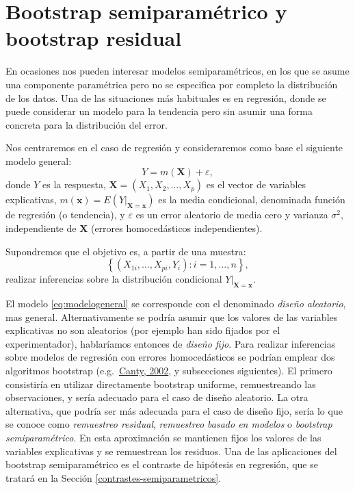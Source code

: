 \documentclass[
]{book}
\theoremstyle{break}
\theoremstyle{definition}
\theoremstyle{definition}
\theoremstyle{definition}
\theoremstyle{remark}
\begin{document}
\hypertarget{boot-reg}{%
\section{Bootstrap semiparamétrico y bootstrap residual}\label{boot-reg}}

En ocasiones nos pueden interesar modelos semiparamétricos, en los que se asume una componente paramétrica pero no se especifica por completo la distribución de los datos.
Una de las situaciones más habituales es en regresión, donde se puede considerar un modelo para la tendencia pero sin asumir una forma concreta para la distribución del error.

Nos centraremos en el caso de regresión y consideraremos como base el siguiente modelo general:
\begin{equation} 
  Y = m(\mathbf{X}) + \varepsilon,
  \label{eq:modelogeneral}
\end{equation}
donde \(Y\) es la respuesta, \(\mathbf{X}=(X_1, X_2, \ldots, X_p)\) es el vector de variables explicativas, \(m(\mathbf{x}) = E\left( \left. Y\right\vert_{\mathbf{X}=\mathbf{x}} \right)\) es la media condicional, denominada función de regresión (o tendencia), y \(\varepsilon\) es un error aleatorio de media cero y varianza \(\sigma^2\), independiente de \(\mathbf{X}\) (errores homocedásticos independientes).

Supondremos que el objetivo es, a partir de una muestra:
\[\left\{ \left( X_{1i}, \ldots, X_{pi}, Y_{i} \right)  : i = 1, \ldots, n \right\},\]
realizar inferencias sobre la distribución condicional
\(\left.Y \right\vert_{\mathbf{X}=\mathbf{x}}\).

El modelo \eqref{eq:modelogeneral} se corresponde con el denominado \emph{diseño aleatorio}, mas general.
Alternativamente se podría asumir que los valores de las variables explicativas no son aleatorios (por ejemplo han sido fijados por el experimentador), hablaríamos entonces de \emph{diseño fijo}.
Para realizar inferencias sobre modelos de regresión con errores homocedásticos se podrían emplear dos algoritmos bootstrap (e.g.~\href{http://cran.fhcrc.org/doc/Rnews/Rnews_2002-3.pdf}{Canty, 2002}, y subsecciones siguientes).
El primero consistiría en utilizar directamente bootstrap uniforme, remuestreando las observaciones, y sería adecuado para el caso de diseño aleatorio.
La otra alternativa, que podría ser más adecuada para el caso de diseño fijo, sería lo que se conoce como \emph{remuestreo residual}, \emph{remuestreo basado en modelos} o \emph{bootstrap semiparamétrico}.
En esta aproximación se mantienen fijos los valores de las variables explicativas y se remuestrean los residuos.
Una de las aplicaciones del bootstrap semiparamétrico es el contraste de hipótesis en regresión, que se tratará en la Sección \ref{contrastes-semiparametricos}.
\end{document}
